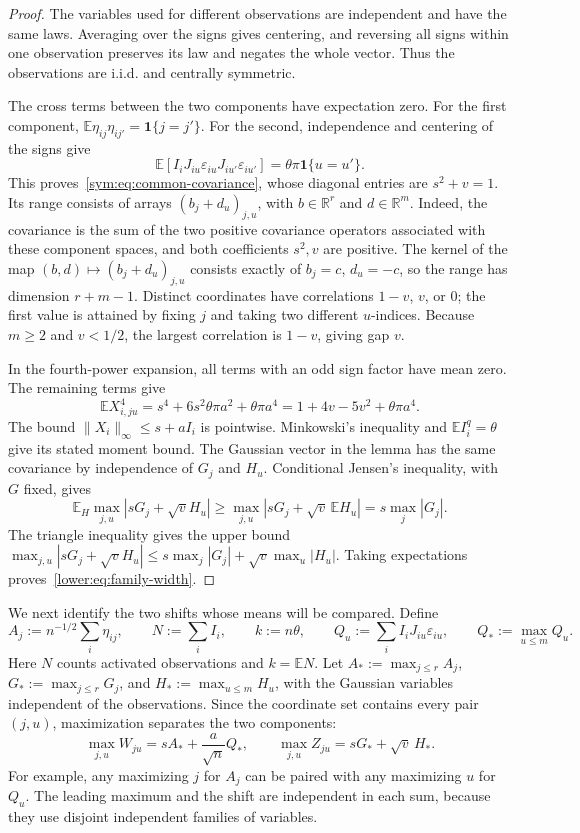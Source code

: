 \documentclass[11pt,letterpaper]{article}
\theoremstyle{remark}
\newcommand{\E}{\mathbb E}
\newcommand{\R}{\mathbb R}
\newcommand{\ind}{\mathbf 1}
\begin{document}
\begin{proof}
The variables used for different observations are independent and
have the same laws. Averaging over the signs gives centering, and
reversing all signs within one observation preserves its law and
negates the whole vector. Thus the observations are i.i.d. and
centrally symmetric.

The cross terms between the two components have expectation zero.
For the first component,
$\E\eta_{ij}\eta_{ij'}=\ind\{j=j'\}$. For the second,
independence and centering of the signs give
\[
 \E[I_iJ_{iu}\varepsilon_{iu}J_{iu'}\varepsilon_{iu'}]
 =\theta\pi\ind\{u=u'\}.
\]
This proves~\eqref{sym:eq:common-covariance}, whose diagonal
entries are $s^2+v=1$. Its range consists of arrays
$(b_j+d_u)_{j,u}$, with $b\in\R^r$ and $d\in\R^m$.
Indeed, the covariance is the sum of the two positive covariance
operators associated with these component spaces, and both
coefficients $s^2,v$ are positive. The kernel of the map
$(b,d)\mapsto(b_j+d_u)_{j,u}$ consists exactly of
$b_j=c$, $d_u=-c$, so the range has dimension $r+m-1$.
Distinct coordinates have correlations $1-v$, $v$, or $0$;
the first value is attained by fixing $j$ and taking two different
$u$-indices. Because $m\ge2$ and $v<1/2$, the largest
correlation is $1-v$, giving gap $v$.

In the fourth-power expansion, all terms with an odd sign factor
have mean zero. The remaining terms give
\[
 \E X_{i,ju}^4=s^4+6s^2\theta\pi a^2+\theta\pi a^4
              =1+4v-5v^2+\theta\pi a^4.
\]
The bound $\|X_i\|_\infty\le s+aI_i$ is pointwise.
Minkowski's inequality and $\E I_i^q=\theta$ give its stated
moment bound. The Gaussian vector in the lemma has the same
covariance by independence of $G_j$ and $H_u$.
Conditional Jensen's inequality, with $G$ fixed, gives
\[
 \E_H\max_{j,u}|sG_j+\sqrt v H_u|
 \ge\max_{j,u}|sG_j+\sqrt v\,\E H_u|
 =s\max_j|G_j|.
\]
The triangle inequality gives the upper bound
$\max_{j,u}|sG_j+\sqrt v H_u|
\le s\max_j|G_j|+\sqrt v\max_u|H_u|$.
Taking expectations proves~\eqref{lower:eq:family-width}.
\end{proof}

We next identify the two shifts whose means will be compared.
Define
\[
 A_j:=n^{-1/2}\sum_i\eta_{ij},\qquad
 N:=\sum_iI_i,\qquad k:=n\theta,\qquad
 Q_u:=\sum_iI_iJ_{iu}\varepsilon_{iu},\qquad
 Q_*:=\max_{u\le m}Q_u.
\]
Here $N$ counts activated observations and $k=\E N$.
Let $A_*:=\max_{j\le r}A_j$, $G_*:=\max_{j\le r}G_j$,
and $H_*:=\max_{u\le m}H_u$, with the Gaussian variables
independent of the observations. Since the coordinate set contains
every pair $(j,u)$, maximization separates the two components:
\begin{equation}
 \max_{j,u}W_{ju}=sA_*+\frac a{\sqrt n}Q_*,\qquad
 \max_{j,u}Z_{ju}=sG_*+\sqrt v\,H_*.
 \label{sym:eq:common-maxima}
\end{equation}
For example, any maximizing $j$ for $A_j$ can be paired with
any maximizing $u$ for $Q_u$. The leading maximum and the shift
are independent in each sum, because they use disjoint independent
families of variables.
\end{document}
